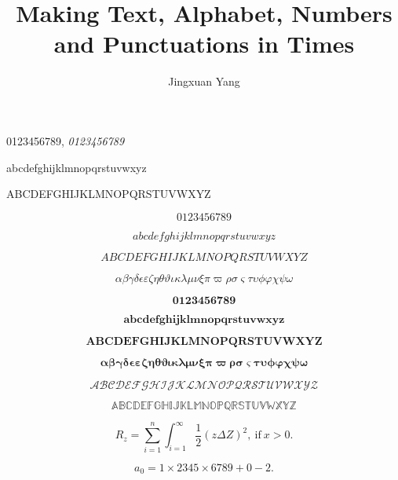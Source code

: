 \documentclass{article}
\title{Making Text, Alphabet, Numbers and Punctuations in Times}
\author{Jingxuan Yang}
\begin{document}
\maketitle

0123456789, \textit{0123456789}

abcdefghijklmnopqrstuvwxyz

ABCDEFGHIJKLMNOPQRSTUVWXYZ

\begin{equation}
  0123456789
\end{equation}

\begin{equation}
  abcdefghijklmnopqrstuvwxyz
\end{equation}

\begin{equation}
  ABCDEFGHIJKLMNOPQRSTUVWXYZ
\end{equation}

\begin{equation}
  \alpha\beta\gamma\delta\epsilon\varepsilon
\zeta\eta\theta\vartheta\iota\kappa\lambda\mu\nu\xi\pi\varpi
\rho\sigma\varsigma\tau\upsilon\phi\varphi\chi\psi\omega
\end{equation}

\begin{equation}
  \bm{0123456789}
\end{equation}

\begin{equation}
  \bm{abcdefghijklmnopqrstuvwxyz}
\end{equation}

\begin{equation}
  \bm{ABCDEFGHIJKLMNOPQRSTUVWXYZ}
\end{equation}

\begin{equation}
  \bm{\alpha\beta\gamma\delta\epsilon\varepsilon
  \zeta\eta\theta\vartheta\iota\kappa\lambda\mu\nu\xi\pi\varpi
  \rho\sigma\varsigma\tau\upsilon\phi\varphi\chi\psi\omega}
\end{equation}

\begin{equation}
  \mathcal{ABCDEFGHIJKLMNOPQRSTUVWXYZ}
\end{equation}

\begin{equation}
  \mathbb{ABCDEFGHIJKLMNOPQRSTUVWXYZ}
\end{equation}

\begin{equation} 
R_{z} =\sum_{i=1}^n\int_{i=1}^\infty \frac12 (z \Delta Z)^2,~\text{if}~x>0.
\end{equation}

\begin{equation}
  a_0=1\times2345\times6789+0-2.
\end{equation}
\end{document}
